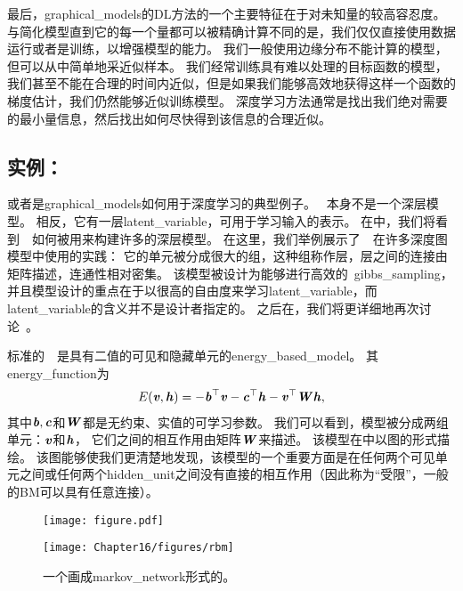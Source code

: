 最后，\gls{graphical_models}的\gls{DL}方法的一个主要特征在于对未知量的较高容忍度。
与简化模型直到它的每一个量都可以被精确计算不同的是，我们仅仅直接使用数据运行或者是训练，以增强模型的能力。%
我们一般使用边缘分布不能计算的模型，但可以从中简单地采近似样本。%
我们经常训练具有难以处理的目标函数的模型，我们甚至不能在合理的时间内近似，但是如果我们能够高效地获得这样一个函数的梯度估计，我们仍然能够近似训练模型。
深度学习方法通常是找出我们绝对需要的最小量信息，然后找出如何尽快得到该信息的合理近似。



\subsection{实例：}
\label{sec:example_the_restricted_boltzmann_machine}
\citep{Smolensky86}或者是\gls{graphical_models}如何用于深度学习的典型例子。 
~本身不是一个深层模型。 
相反，它有一层\gls{latent_variable}，可用于学习输入的表示。 
在中，我们将看到~~如何被用来构建许多的深层模型。
在这里，我们举例展示了~~在许多深度图模型中使用的实践：
它的单元被分成很大的组，这种组称作层，层之间的连接由矩阵描述，连通性相对密集。
该模型被设计为能够进行高效的~\gls{gibbs_sampling}，并且模型设计的重点在于以很高的自由度来学习\gls{latent_variable}，而\gls{latent_variable}的含义并不是设计者指定的。
之后在，我们将更详细地再次讨论~。


标准的~~是具有二值的可见和隐藏单元的\gls{energy_based_model}。 其\gls{energy_function}为
\begin{align}
\label{eqn:1610}
E(\boldsymbol{\mathit{v}},\boldsymbol{\mathit{h}}) = -\boldsymbol{\mathit{b}}^{\top}\boldsymbol{\mathit{v}} - \boldsymbol{\mathit{c}}^{\top}\boldsymbol{\mathit{h}} - \boldsymbol{\mathit{v}}^{\top}\boldsymbol{\mathit{W}}\boldsymbol{\mathit{h}},
\end{align}
其中$\boldsymbol{\mathit{b}},\boldsymbol{\mathit{c}}$和$\boldsymbol{\mathit{W}}$都是无约束、实值的可学习参数。
我们可以看到，模型被分成两组单元：$\boldsymbol{\mathit{v}}$和$\boldsymbol{\mathit{h}}$，
它们之间的相互作用由矩阵$\boldsymbol{\mathit{W}}$来描述。
该模型在中以图的形式描绘。
该图能够使我们更清楚地发现，该模型的一个重要方面是在任何两个可见单元之间或任何两个\gls{hidden_unit}之间没有直接的相互作用（因此称为``受限''，一般的\gls{BM}可以具有任意连接）。



\begin{figure}[!htb]
\ifOpenSource
\centerline{\texttt{[image: figure.pdf]}}
\else
	\centerline{\texttt{[image: Chapter16/figures/rbm]}}	
\fi
	\caption{一个画成\gls{markov_network}形式的。}
	\label{fig:rbm}
\end{figure}



